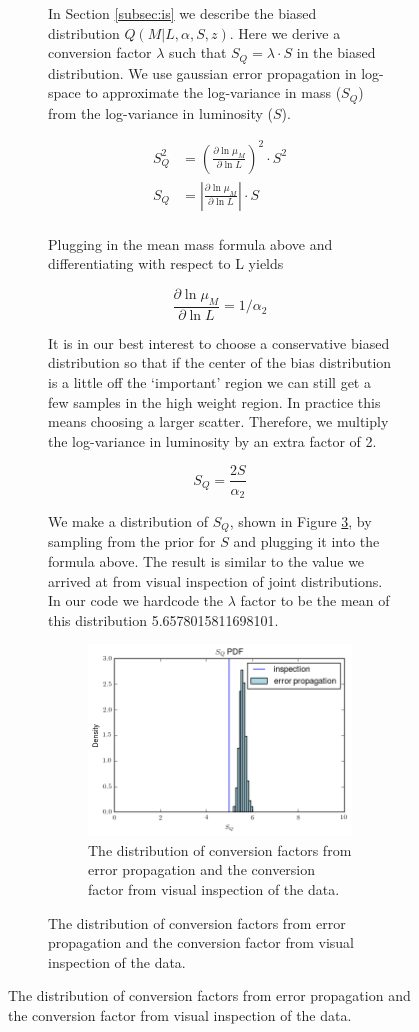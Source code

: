\documentclass[\docopts]{\docclass}
\begin{document}
\begin{figure}[h!]
\begin{figure}[h!]
In Section \ref{subsec:is} we describe the biased distribution $Q(M|L, \alpha, S, z)$. 
Here we derive a conversion factor $\lambda$ such that $S_Q = \lambda \cdot S$ in the biased distribution. 
We use gaussian error propagation in log-space to approximate the log-variance in mass ($S_Q$) from the log-variance in luminosity ($S$).

\begin{align*}
S_Q^2 &= \left(\frac{\partial \ln \mu_M}{\partial \ln L}\right)^2 \cdot S^2\\
S_Q &= \left|\frac{\partial \ln \mu_M}{\partial \ln L}\right| \cdot S\\
\end{align*}

\noindent Plugging in the mean mass formula above and differentiating with respect to L yields

$$\frac{\partial \ln \mu_M}{\partial \ln L} = 1/\alpha_2$$

\noindent It is in our best interest to choose a conservative biased distribution so that if the center of the bias distribution is a little off the `important' region we can still get a few samples in the high weight region. In practice this means choosing a larger scatter. Therefore, we multiply the log-variance in luminosity by an extra factor of 2.

$$S_Q = \frac{2S}{\alpha_2}$$

\noindent We make a distribution of $S_Q$, shown in Figure \ref{fig:error_prop}, by sampling from the prior for $S$ and plugging it into the formula above. The result is similar to the value we arrived at from visual inspection of joint distributions. In our code we hardcode the $\lambda$ factor to be the mean of this distribution 5.6578015811698101.

\begin{figure}[h]
\centering
\includegraphics[width=0.6\columnwidth]{error_prop.png}
\caption{
The distribution of conversion factors from error propagation and the conversion factor from visual inspection of the data. 
\label{fig:error_prop}}
\end{figure}


\end{figure}
\end{figure}
\end{document}
